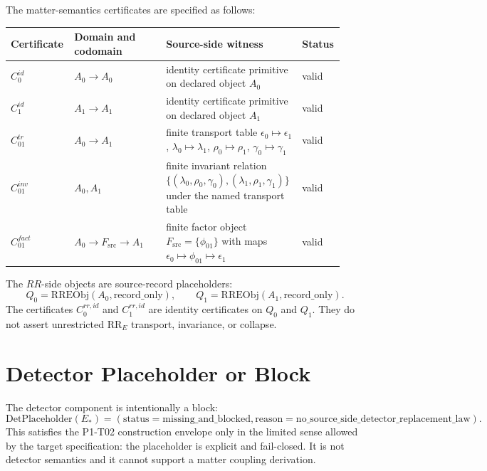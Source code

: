 \documentclass[11pt]{article}
\newcommand{\EStar}{E_{\ast}}
\newcommand{\DetPlaceholder}{\mathrm{DetPlaceholder}}
\newcommand{\RRObj}{\mathrm{RREObj}}
\newcommand{\Src}{\mathrm{src}}
\begin{document}
The matter-semantics certificates are specified as follows:

\begin{center}
\begin{tabular}{>{\raggedright\arraybackslash}p{0.16\linewidth}
                >{\raggedright\arraybackslash}p{0.27\linewidth}
                >{\raggedright\arraybackslash}p{0.40\linewidth}
                >{\raggedright\arraybackslash}p{0.10\linewidth}}
\toprule
Certificate & Domain and codomain & Source-side witness & Status \\
\midrule
\(C^{id}_0\) & \(A_0\to A_0\) & identity certificate primitive on declared object \(A_0\) & valid \\
\(C^{id}_1\) & \(A_1\to A_1\) & identity certificate primitive on declared object \(A_1\) & valid \\
\(C^{tr}_{01}\) & \(A_0\to A_1\) & finite transport table
\(\epsilon_0\mapsto\epsilon_1\),
\(\lambda_0\mapsto\lambda_1\),
\(\rho_0\mapsto\rho_1\),
\(\gamma_0\mapsto\gamma_1\) & valid \\
\(C^{inv}_{01}\) & \(A_0,A_1\) & finite invariant relation
\(\{(\lambda_0,\rho_0,\gamma_0),(\lambda_1,\rho_1,\gamma_1)\}\)
under the named transport table & valid \\
\(C^{fact}_{01}\) & \(A_0\to F_{\Src}\to A_1\) & finite factor object
\(F_{\Src}=\{\phi_{01}\}\) with maps
\(\epsilon_0\mapsto\phi_{01}\mapsto\epsilon_1\) & valid \\
\bottomrule
\end{tabular}
\end{center}

The \(RR\)-side objects are source-record placeholders:
\[
  Q_0=\RRObj(A_0,\mathrm{record\_only}),\qquad
  Q_1=\RRObj(A_1,\mathrm{record\_only}).
\]
The certificates \(C^{rr,id}_0\) and \(C^{rr,id}_1\) are identity certificates
on \(Q_0\) and \(Q_1\). They do not assert unrestricted \(\mathrm{RR}_E\)
transport, invariance, or collapse.

\section{Detector Placeholder or Block}

The detector component is intentionally a block:
\[
  \DetPlaceholder(\EStar)=
  (\mathrm{status}=\mathrm{missing\_and\_blocked},
   \mathrm{reason}=\mathrm{no\_source\_side\_detector\_replacement\_law}).
\]
This satisfies the P1-T02 construction envelope only in the limited sense
allowed by the target specification: the placeholder is explicit and
fail-closed. It is not detector semantics and it cannot support a matter
coupling derivation.
\end{document}

